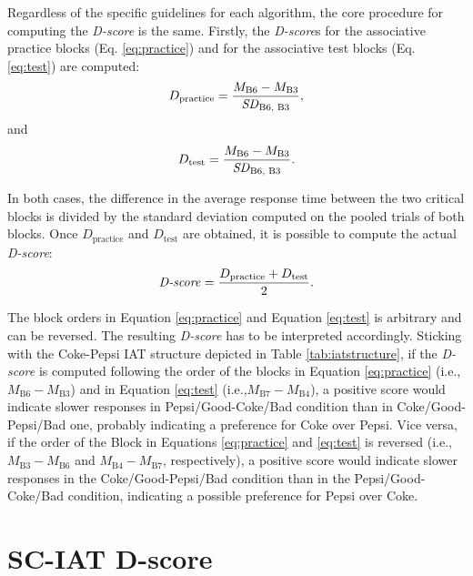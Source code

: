 \documentclass[12pt]{book}
\begin{document}
Regardless of the specific guidelines for each algorithm, the core procedure for computing the \emph{D-score} is the same. Firstly, the \emph{D-score}s for the associative practice blocks (Eq. \ref{eq:practice}) and for the associative test blocks (Eq. \ref{eq:test}) are computed: 
%
\begin{equation}\label{eq:practice}
	D_{\text{practice}} = \frac{M_{\text{B6}} - M_{\text{B3}}}{\text{\emph{SD}}_{\text{B6, B3}}}, 
\end{equation}
%
and 
%
\begin{equation}\label{eq:test}
D_{\text{test}} = \frac{M_{\text{B6}} - M_{\text{B3}}}{\text{\emph{SD}}_{\text{B6, B3}}}.
\end{equation}

In both cases, the difference in the average response time between the two critical blocks is divided by the standard deviation computed on the pooled trials of both blocks. Once $D_{\text{practice}}$ and $D_{\text{test}}$ are obtained, it is possible to compute the actual \emph{D-score}: 
%
\begin{equation}\label{eq:dscore}
	\text{\emph{D-score}} = \frac{D_{\text{practice}} + D_{\text{test}}}{2}.
\end{equation}

The block orders in Equation \ref{eq:practice} and Equation \ref{eq:test} is arbitrary and can be reversed. The resulting \emph{D-score} has to be interpreted accordingly. Sticking with the Coke-Pepsi IAT structure depicted in Table \ref{tab:iatstructure}, if the \emph{D-score} is computed following the order of the blocks in Equation \ref{eq:practice} (i.e., $M_{\text{B6}} - M_{\text{B3}}$) and in Equation \ref{eq:test} (i.e.,$M_{\text{B7}} - M_{\text{B4}}$), a positive score would indicate slower responses in Pepsi/Good-Coke/Bad condition than in Coke/Good-Pepsi/Bad one, probably indicating a preference for Coke over Pepsi. Vice versa, if the order of the Block in Equations \ref{eq:practice} and \ref{eq:test} is reversed (i.e., $M_{\text{B3}} - M_{\text{B6}}$ and $M_{\text{B4}} - M_{\text{B7}}$, respectively), a positive score would indicate slower responses in the Coke/Good-Pepsi/Bad condition than in the Pepsi/Good-Coke/Bad condition, indicating a possible preference for Pepsi over Coke.
			 

\section{SC-IAT D-score}\label{sec:sciatD}
\end{document}
